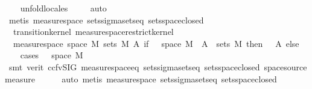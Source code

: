 \begin{isabellebody}
%
\isadelimproof
\ \ %
\endisadelimproof
%
\isatagproof
{}\isamarkupfalse%
\ unfold{\isacharunderscore}{\kern0pt}locales\isanewline
\ \ \ \isamarkupfalse%
\ auto\isanewline
\ \ \ \isamarkupfalse%
\ {\isacharparenleft}{\kern0pt}metis\ measure{\isacharunderscore}{\kern0pt}space{\isacharunderscore}{\kern0pt}{}\ sets{\isachardot}{\kern0pt}sigma{\isacharunderscore}{\kern0pt}sets{\isacharunderscore}{\kern0pt}eq\ sets{\isachardot}{\kern0pt}space{\isacharunderscore}{\kern0pt}closed{\isacharparenright}{\kern0pt}\isanewline
\ \ \isamarkupfalse%
%
\endisatagproof
{\isafoldproof}%
%
\isadelimproof
\isanewline
%
\endisadelimproof
\isanewline
{}\isamarkupfalse%
\ {\isacharparenleft}{\kern0pt}\ transition{\isacharunderscore}{\kern0pt}kernel{\isacharparenright}{\kern0pt}\ measure{\isacharunderscore}{\kern0pt}space{\isacharunderscore}{\kern0pt}restrict{\isacharunderscore}{\kern0pt}kernel{\isacharcolon}{\kern0pt}\isanewline
\ \ {\isachardoublequoteopen}measure{\isacharunderscore}{\kern0pt}space\ {\isacharparenleft}{\kern0pt}space\ M{\isacharprime}{\kern0pt}{\isacharparenright}{\kern0pt}\ {\isacharparenleft}{\kern0pt}sets\ M{\isacharprime}{\kern0pt}{\isacharparenright}{\kern0pt}\ {\isacharparenleft}{\kern0pt}{\isasymlambda}A{\isacharprime}{\kern0pt}{\isachardot}{\kern0pt}\ if\ {\isasymomega}\ {\isasymin}\ space\ M\ {\isasymand}\ A{\isacharprime}{\kern0pt}\ {\isasymin}\ sets\ M{\isacharprime}{\kern0pt}\ then\ {\isasymkappa}\ {\isasymomega}\ A{\isacharprime}{\kern0pt}\ else\ {}{\isacharparenright}{\kern0pt}{\isachardoublequoteclose}\isanewline
%
\isadelimproof
\ \ %
\endisadelimproof
%
\isatagproof
{}\isamarkupfalse%
\ {\isacharparenleft}{\kern0pt}cases\ {\isachardoublequoteopen}{\isasymomega}\ {\isasymin}\ space\ M{\isachardoublequoteclose}{\isacharparenright}{\kern0pt}\isanewline
\ \ \ \ \isamarkupfalse%
\ {\isacharparenleft}{\kern0pt}smt\ {\isacharparenleft}{\kern0pt}verit{\isacharcomma}{\kern0pt}\ ccfv{\isacharunderscore}{\kern0pt}SIG{\isacharparenright}{\kern0pt}\ measure{\isacharunderscore}{\kern0pt}space{\isacharunderscore}{\kern0pt}eq\ sets{\isachardot}{\kern0pt}sigma{\isacharunderscore}{\kern0pt}sets{\isacharunderscore}{\kern0pt}eq\ sets{\isachardot}{\kern0pt}space{\isacharunderscore}{\kern0pt}closed\ space{\isacharunderscore}{\kern0pt}source{\isacharunderscore}{\kern0pt}measure{\isacharparenright}{\kern0pt}\isanewline
\ \ \ \ \isamarkupfalse%
\ {\isacharparenleft}{\kern0pt}auto{\isacharcomma}{\kern0pt}\ metis\ measure{\isacharunderscore}{\kern0pt}space{\isacharunderscore}{\kern0pt}{}\ sets{\isachardot}{\kern0pt}sigma{\isacharunderscore}{\kern0pt}sets{\isacharunderscore}{\kern0pt}eq\ sets{\isachardot}{\kern0pt}space{\isacharunderscore}{\kern0pt}closed{\isacharparenright}{\kern0pt}\isanewline

\end{isabellebody}
